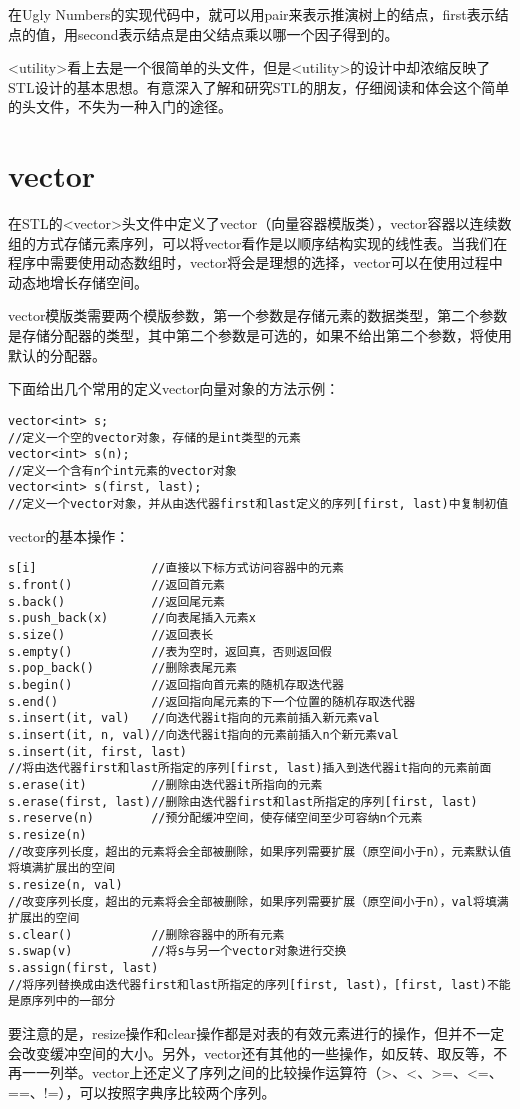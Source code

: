 在Ugly Numbers的实现代码中，就可以用pair来表示推演树上的结点，first表示结点的值，用second表示结点是由父结点乘以哪一个因子得到的。

<utility>看上去是一个很简单的头文件，但是<utility>的设计中却浓缩反映了STL设计的基本思想。有意深入了解和研究STL的朋友，仔细阅读和体会这个简单的头文件，不失为一种入门的途径。


\section{vector}
在STL的<vector>头文件中定义了vector（向量容器模版类），vector容器以连续数组的方式存储元素序列，可以将vector看作是以顺序结构实现的线性表。当我们在程序中需要使用动态数组时，vector将会是理想的选择，vector可以在使用过程中动态地增长存储空间。 

vector模版类需要两个模版参数，第一个参数是存储元素的数据类型，第二个参数是存储分配器的类型，其中第二个参数是可选的，如果不给出第二个参数，将使用默认的分配器。

下面给出几个常用的定义vector向量对象的方法示例：
\begin{lstlisting}
vector<int> s;      
//定义一个空的vector对象，存储的是int类型的元素
vector<int> s(n);   
//定义一个含有n个int元素的vector对象
vector<int> s(first, last); 
//定义一个vector对象，并从由迭代器first和last定义的序列[first, last)中复制初值
\end{lstlisting}

vector的基本操作：

\begin{lstlisting}
s[i]                //直接以下标方式访问容器中的元素
s.front()           //返回首元素
s.back()            //返回尾元素
s.push_back(x)      //向表尾插入元素x
s.size()            //返回表长
s.empty()           //表为空时，返回真，否则返回假
s.pop_back()        //删除表尾元素
s.begin()           //返回指向首元素的随机存取迭代器
s.end()             //返回指向尾元素的下一个位置的随机存取迭代器
s.insert(it, val)   //向迭代器it指向的元素前插入新元素val
s.insert(it, n, val)//向迭代器it指向的元素前插入n个新元素val
s.insert(it, first, last)   
//将由迭代器first和last所指定的序列[first, last)插入到迭代器it指向的元素前面
s.erase(it)         //删除由迭代器it所指向的元素
s.erase(first, last)//删除由迭代器first和last所指定的序列[first, last)
s.reserve(n)        //预分配缓冲空间，使存储空间至少可容纳n个元素
s.resize(n)
//改变序列长度，超出的元素将会全部被删除，如果序列需要扩展（原空间小于n），元素默认值将填满扩展出的空间
s.resize(n, val)
//改变序列长度，超出的元素将会全部被删除，如果序列需要扩展（原空间小于n），val将填满扩展出的空间
s.clear()           //删除容器中的所有元素
s.swap(v)           //将s与另一个vector对象进行交换
s.assign(first, last)
//将序列替换成由迭代器first和last所指定的序列[first, last)，[first, last)不能是原序列中的一部分
\end{lstlisting}
要注意的是，resize操作和clear操作都是对表的有效元素进行的操作，但并不一定会改变缓冲空间的大小。另外，vector还有其他的一些操作，如反转、取反等，不再一一列举。vector上还定义了序列之间的比较操作运算符（>、<、>=、<=、==、!=），可以按照字典序比较两个序列。

